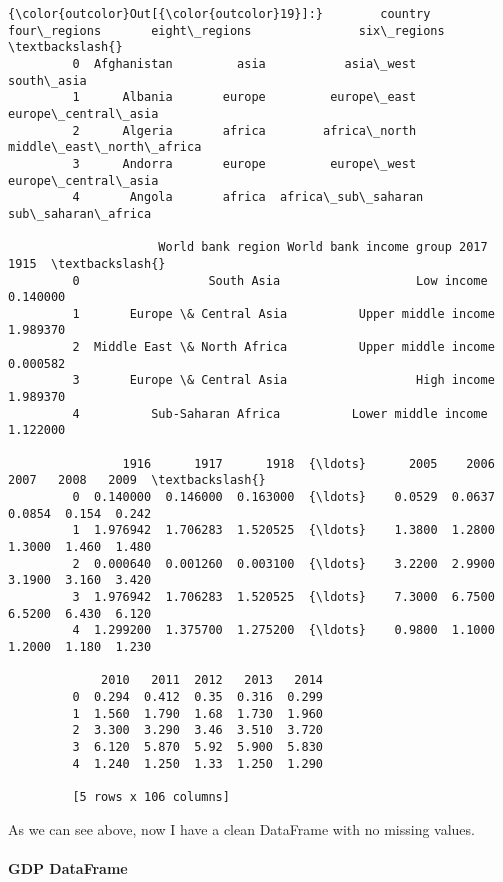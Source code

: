 \documentclass[11pt]{article}
\begin{document}
\begin{Verbatim}[commandchars=\\\{\}]
{\color{outcolor}Out[{\color{outcolor}19}]:}        country four\_regions       eight\_regions               six\_regions  \textbackslash{}
         0  Afghanistan         asia           asia\_west                south\_asia   
         1      Albania       europe         europe\_east       europe\_central\_asia   
         2      Algeria       africa        africa\_north  middle\_east\_north\_africa   
         3      Andorra       europe         europe\_west       europe\_central\_asia   
         4       Angola       africa  africa\_sub\_saharan        sub\_saharan\_africa   
         
                     World bank region World bank income group 2017      1915  \textbackslash{}
         0                  South Asia                   Low income  0.140000   
         1       Europe \& Central Asia          Upper middle income  1.989370   
         2  Middle East \& North Africa          Upper middle income  0.000582   
         3       Europe \& Central Asia                  High income  1.989370   
         4          Sub-Saharan Africa          Lower middle income  1.122000   
         
                1916      1917      1918  {\ldots}      2005    2006    2007   2008   2009  \textbackslash{}
         0  0.140000  0.146000  0.163000  {\ldots}    0.0529  0.0637  0.0854  0.154  0.242   
         1  1.976942  1.706283  1.520525  {\ldots}    1.3800  1.2800  1.3000  1.460  1.480   
         2  0.000640  0.001260  0.003100  {\ldots}    3.2200  2.9900  3.1900  3.160  3.420   
         3  1.976942  1.706283  1.520525  {\ldots}    7.3000  6.7500  6.5200  6.430  6.120   
         4  1.299200  1.375700  1.275200  {\ldots}    0.9800  1.1000  1.2000  1.180  1.230   
         
             2010   2011  2012   2013   2014  
         0  0.294  0.412  0.35  0.316  0.299  
         1  1.560  1.790  1.68  1.730  1.960  
         2  3.300  3.290  3.46  3.510  3.720  
         3  6.120  5.870  5.92  5.900  5.830  
         4  1.240  1.250  1.33  1.250  1.290  
         
         [5 rows x 106 columns]
\end{Verbatim}
            
    As we can see above, now I have a clean DataFrame with no missing
values.

    \hypertarget{gdp-dataframe}{%
\paragraph{GDP DataFrame}\label{gdp-dataframe}}
\end{document}
